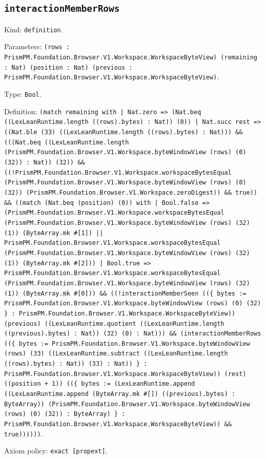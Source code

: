 \documentclass[11pt]{article}
\begin{document}
\subsection*{\texttt{interactionMemberRows}}
\noindent Kind: \texttt{definition}.\par
\noindent Parameters: \texttt{(rows : PrismPM.Foundation.Browser.V1.Workspace.WorkspaceByteView) (remaining : Nat) (position : Nat) (previous : PrismPM.Foundation.Browser.V1.Workspace.WorkspaceByteView)}.\par
\noindent Type: \texttt{Bool}.\par
\noindent Definition: \texttt{(match remaining with | Nat.zero => (Nat.beq ((LexLeanRuntime.length ((rows).bytes) : Nat)) (0)) | Nat.succ rest => ((Nat.ble (33) ((LexLeanRuntime.length ((rows).bytes) : Nat))) \&\& (((Nat.beq ((LexLeanRuntime.length (PrismPM.Foundation.Browser.V1.Workspace.byteWindowView (rows) (0) (32)) : Nat)) (32)) \&\& ((!PrismPM.Foundation.Browser.V1.Workspace.workspaceBytesEqual (PrismPM.Foundation.Browser.V1.Workspace.byteWindowView (rows) (0) (32)) (PrismPM.Foundation.Browser.V1.Workspace.zeroDigest)) \&\& true)) \&\& ((match (Nat.beq (position) (0)) with | Bool.false => (PrismPM.Foundation.Browser.V1.Workspace.workspaceBytesEqual (PrismPM.Foundation.Browser.V1.Workspace.byteWindowView (rows) (32) (1)) (ByteArray.mk \#[1]) || PrismPM.Foundation.Browser.V1.Workspace.workspaceBytesEqual (PrismPM.Foundation.Browser.V1.Workspace.byteWindowView (rows) (32) (1)) (ByteArray.mk \#[2])) | Bool.true => PrismPM.Foundation.Browser.V1.Workspace.workspaceBytesEqual (PrismPM.Foundation.Browser.V1.Workspace.byteWindowView (rows) (32) (1)) (ByteArray.mk \#[0])) \&\& ((!interactionMemberSeen ((\{ bytes := PrismPM.Foundation.Browser.V1.Workspace.byteWindowView (rows) (0) (32) \} : PrismPM.Foundation.Browser.V1.Workspace.WorkspaceByteView)) (previous) ((LexLeanRuntime.quotient ((LexLeanRuntime.length ((previous).bytes) : Nat)) (32) (0) : Nat))) \&\& (interactionMemberRows ((\{ bytes := PrismPM.Foundation.Browser.V1.Workspace.byteWindowView (rows) (33) ((LexLeanRuntime.subtract ((LexLeanRuntime.length ((rows).bytes) : Nat)) (33) : Nat)) \} : PrismPM.Foundation.Browser.V1.Workspace.WorkspaceByteView)) (rest) ((position + 1)) ((\{ bytes := (LexLeanRuntime.append ((LexLeanRuntime.append (ByteArray.mk \#[]) ((previous).bytes) : ByteArray)) (PrismPM.Foundation.Browser.V1.Workspace.byteWindowView (rows) (0) (32)) : ByteArray) \} : PrismPM.Foundation.Browser.V1.Workspace.WorkspaceByteView)) \&\& true))))))}.\par
\noindent Axiom policy: \texttt{exact [propext]}.\par
\end{document}
